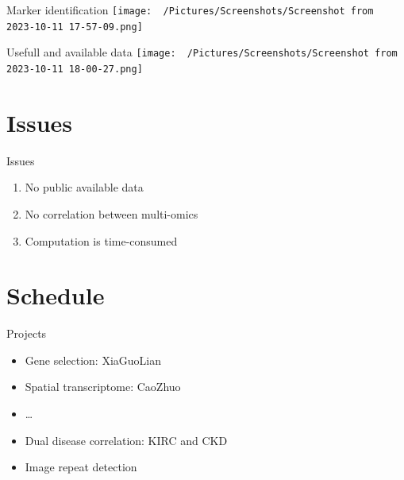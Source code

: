 \documentclass[
  5pt,
  ignorenonframetext,
]{beamer}
\providecommand{\tightlist}{%
  \setlength{\itemsep}{0pt}\setlength{\parskip}{0pt}}
\begin{document}
\begin{frame}{Marker identification}
\protect\hypertarget{marker-identification}{}
\texttt{[image: ~/Pictures/Screenshots/Screenshot from 2023-10-11 17-57-09.png]}
\end{frame}

\begin{frame}{Usefull and available data}
\protect\hypertarget{usefull-and-available-data}{}
\texttt{[image: ~/Pictures/Screenshots/Screenshot from 2023-10-11 18-00-27.png]}
\end{frame}

\hypertarget{issues}{%
\section{Issues}\label{issues}}

\begin{frame}{Issues}
\protect\hypertarget{issues-1}{}
\begin{enumerate}
\tightlist
\item
  No public available data
\item
  No correlation between multi-omics
\item
  Computation is time-consumed
\end{enumerate}
\end{frame}

\hypertarget{schedule}{%
\section{Schedule}\label{schedule}}

\begin{frame}{Projects}
\protect\hypertarget{projects}{}
\begin{itemize}
\tightlist
\item
  Gene selection: XiaGuoLian
\item
  Spatial transcriptome: CaoZhuo
\item
  \ldots{}
\item
  Dual disease correlation: KIRC and CKD
\item
  Image repeat detection
\end{itemize}
\end{frame}
\end{document}

